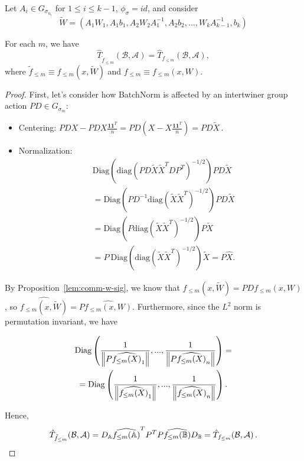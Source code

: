 \documentclass[../main.tex]{subfiles}
\begin{document}
\begin{proposition}
\label{prop:rob_rel}
Let $A_i \in G_{\sigma_{n_i}}$ for $1 \leq i \leq k-1$, $\phi_{\sigma}=id$, and consider 
  \begin{equation*}
  \widetilde{W}  = (A_1 W_1, A_1b_1, A_2 W_2 A_1^{-1}, A_2 b_2 , \dots,
  W_{k}A_{k-1}^{-1}, b_{k})
  \end{equation*}

For each $m$, we have
\[
\hat{T}_{\tilde{f}_{\leq m}}(\mathcal{B}, \mathcal{A}) = \hat{T}_{f_{\leq m}}(\mathcal{B}, \mathcal{A}),
\]
where $\tilde{f}_{\leq m}\equiv f_{\leq m}(x, \widetilde{W})$ and $f_{\leq m}\equiv f_{\leq m}(x, W)$.
\end{proposition}
\begin{proof}
First, let's consider how BatchNorm is affected by an intertwiner group action $PD \in G_{\sigma_m}$:
\begin{itemize}
    \item Centering: $
    PDX-PDX \frac{\mathbf{1}\mathbf{1}^T}{n} = PD\left( X-X \frac{\mathbf{1}\mathbf{1}^T}{n} \right) = PD \tilde{X}\,.$
    \item Normalization:
    \begin{align*}
        &\text{Diag}\left(\text{diag}(PD \tilde{X} \tilde{X}^T D P^T)^{-1/2}\right)PD \tilde{X} \\
        &= \text{Diag}(PD^{-1}\text{diag}(\tilde{X} \tilde{X}^T)^{-1/2})PD \tilde{X}\\
        &= \text{Diag}(P\text{diag}(\tilde{X} \tilde{X}^T)^{-1/2})P \tilde{X}\\
        &= P\ \text{Diag}(\text{diag}(\tilde{X} \tilde{X}^T)^{-1/2})\tilde{X} = P \hat{X}.
    \end{align*}
\end{itemize}

By Proposition~\ref{lem:comm-w-sig}, we know that $ f_{\leq m}(x, \widetilde{W}) = PD f_{\leq m}(x, W)$, so $\widehat{f_{\leq m}(x, \widetilde{W})}= P \widehat{f_{\leq m}(x, W)}$. Furthermore, since the $L^2$ norm is permutation invariant, we have

\begin{gather*}
\text{Diag}\left(\frac{1}{\left\lVert P\widehat{f_{\leq m}(X)}_{1} \right\rVert}, ..., \frac{1}{\left\lVert P\widehat{f_{\leq m}(X)}_{n} \right\rVert} \right) =\\
=\text{Diag}\left(\frac{1}{\left\lVert \widehat{f_{\leq m}(X)}_{1} \right\rVert}, ..., \frac{1}{\left\lVert \widehat{f_{\leq m}(X)}_{n} \right\rVert} \right).
\end{gather*}

Hence, 
\[
\hat{T}_{\tilde{f}_{\leq m}}(\mathcal{B}, \mathcal{A}) =
D_{\mathbb{A}} \widehat{f_{\leq m}(\mathbb{A})}^T P^T P \widehat{f_{\leq m}(\mathbb{B})} D_{\mathbb{B}}=
\hat{T}_{f_{\leq m}}(\mathcal{B}, \mathcal{A})\,.
\]
\end{proof}
\end{document}

